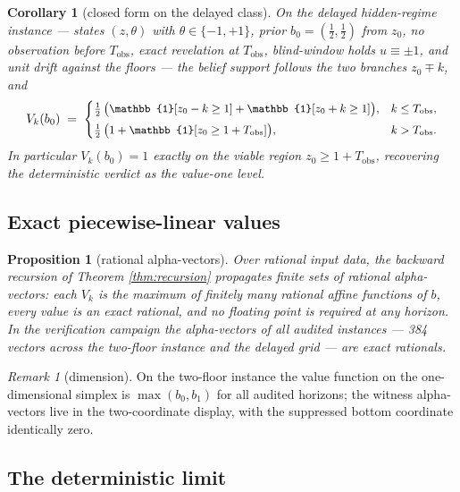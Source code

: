 \documentclass[10pt,twocolumn]{article}
\theoremstyle{plain}
\newtheorem{proposition}[theorem]{Proposition}
\newtheorem{corollary}[theorem]{Corollary}
\theoremstyle{definition}
\theoremstyle{remark}
\newtheorem{remark}[theorem]{Remark}
\begin{document}
\begin{corollary}[closed form on the delayed class]\label{cor:closed}
On the delayed hidden-regime instance --- states \((z, \theta)\) with
\(\theta \in \{-1, +1\}\), prior \(b_{0} = (\tfrac{1}{2}, \tfrac{1}{2})\)
from \(z_{0}\), no observation before \(T_{\mathrm{obs}}\), exact
revelation at \(T_{\mathrm{obs}}\), blind-window holds
\(u \equiv \pm 1\), and unit drift against the floors --- the belief
support follows the two branches \(z_{0} \mp k\), and
\[
\small
V_{k}(b_{0}) \;=\;
\begin{cases}
\tfrac{1}{2}\,\bigl(\mathbb{1}[z_{0} - k \ge 1] + \mathbb{1}[z_{0} + k \ge 1]\bigr), & k \le T_{\mathrm{obs}},\\[1ex]
\tfrac{1}{2}\,\bigl(1 + \mathbb{1}[z_{0} \ge 1 + T_{\mathrm{obs}}]\bigr), & k > T_{\mathrm{obs}}.
\end{cases}
\]
In particular \(V_{k}(b_{0}) = 1\) exactly on the viable region
\(z_{0} \ge 1 + T_{\mathrm{obs}}\), recovering the deterministic verdict
as the value-one level.
\end{corollary}

\subsection{Exact piecewise-linear values}\label{exact}

\begin{proposition}[rational alpha-vectors]\label{prop:pl}
Over rational input data, the backward recursion of Theorem
\ref{thm:recursion} propagates finite sets of rational alpha-vectors:
each \(V_{k}\) is the maximum of finitely many rational affine functions
of \(b\), every value is an exact rational, and no floating point is
required at any horizon. In the verification campaign the alpha-vectors
of all audited instances --- 384 vectors across the two-floor instance
and the delayed grid --- are exact rationals.
\end{proposition}

\begin{remark}[dimension]\label{rem:dim}
On the two-floor instance the value function on the one-dimensional
simplex is \(\max(b_{0}, b_{1})\) for all audited horizons; the witness
alpha-vectors live in the two-coordinate display, with the suppressed
bottom coordinate identically zero.
\end{remark}

\subsection{The deterministic limit}\label{deterministic}
\end{document}
